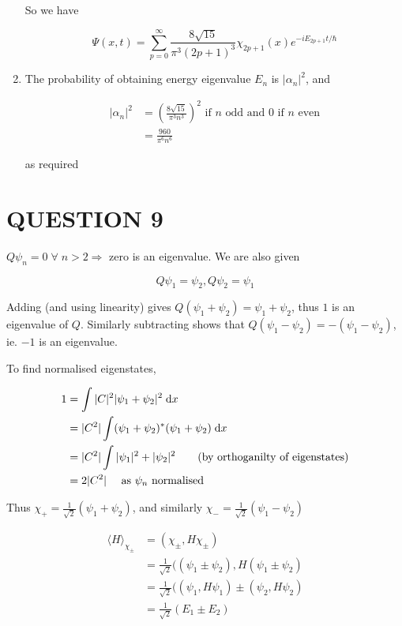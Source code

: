 \documentclass[a4paper]{article}
\begin{document}
\begin{enumerate}
	So we have
	
	\[ \Psi(x,t) = \sum_{p=0}^{\infty} \frac{8 \sqrt{15}}{\pi^{3}(2p+1)^{3}} \chi_{2p + 1}(x) e^{- i E_{2p + 1} t / \hbar } \]
	
	\item The probability of obtaining energy eigenvalue $ E_{n} $ is $ | \alpha_{n} |^{2} $, and
	
	\begin{align*}
	| \alpha_{n} |^{2} & = \left( \frac{8 \sqrt{15}}{\pi^{3}n^{3}} \right)^{2} \text{ if } n \text{ odd and } 0 \text{ if } n \text{ even} \\
	& = \frac{960}{\pi^{6}n^{6}} 
	\end{align*}
	
	as required
	
\end{enumerate}


\section{QUESTION 9}


$ Q \psi_{n} = 0 \; \forall \;  n > 2 \Rightarrow  $ zero is an eigenvalue. We are also given

\[ Q \psi_{1} = \psi_{2}, Q \psi_{2} = \psi_{1} \]

Adding (and using linearity) gives $ Q(\psi_{1} + \psi_{2})  = \psi_{1} + \psi_{2} $, thus $ 1 $ is an eigenvalue of $ Q $. Similarly subtracting shows that $ Q (\psi_{1} - \psi_{2}) = - (\psi_{1} - \psi_{2}) $, ie. $ -1 $ is an eigenvalue. 

To find normalised eigenstates, 

\begin{align*}
1 & = \int | C |^{2} | \psi_{1} + \psi_{2} |^{2} \; \mathrm{d} x  \\
& = | C^{2} | \int  (\psi_{1} + \psi_{2})^{*} ( \psi_{1} + \psi_{2}) \; \mathrm{d} x\\
& = |  C^{2} | \int | \psi_{1} |^{2} + | \psi_{2} |^{2} \qquad ( \text{by orthoganilty of eigenstates})\\
& = 2 | C^{2} | \quad \text{ as } \psi_{n} \text{ normalised}
\end{align*}

Thus $ \chi_{+} = \frac{1}{\sqrt{2}} (\psi_{1} + \psi_{2})  $, and similarly $ \chi_{-} = \frac{1}{\sqrt{2}} ( \psi_{1} - \psi_{2})  $


\begin{align*}
\langle H \rangle_{\chi_{\pm}} & = ( \chi_{\pm}, H \chi_{\pm} )  \\
& = \frac{1}{\sqrt{2}} (  (\psi_{1} \pm \psi_{2}),  H( \psi_{1} \pm \psi_{2} ) \\
& = \frac{1}{\sqrt{2}} (  (\psi_{1}, H \psi_{1}) \pm  ( \psi_{2}, H \psi_{2} ) \\
& = \frac{1}{\sqrt{2}} ( E_{1} \pm E_{2} )
\end{align*}
\end{document}
